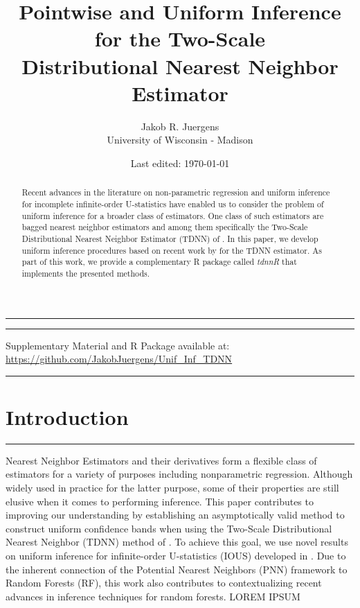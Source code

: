 \documentclass[letterpaper,10pt]{article}
\numberwithin{equation}{section}
\numberwithin{theorem}{section}
\numberwithin{remark}{section}
\numberwithin{example}{section}
\theoremstyle{definition}
\newcommand{\1}{\mathbb{1}}
\begin{document}
\singlespacing
\title{Pointwise and Uniform Inference for the Two-Scale\\ Distributional Nearest Neighbor Estimator}
\date{Last edited: \today}
\author{Jakob R. Juergens \\ University of Wisconsin - Madison}
\maketitle
\hrule
\onehalfspacing
\begin{abstract}
	Recent advances in the literature on non-parametric regression and uniform inference for incomplete infinite-order U-statistics have enabled us to consider the problem of uniform inference for a broader class of estimators.
	One class of such estimators are bagged nearest neighbor estimators and among them specifically the Two-Scale Distributional Nearest Neighbor Estimator (TDNN) of \citet{demirkaya_optimal_2024}.
	In this paper, we develop uniform inference procedures based on recent work by \citet{ritzwoller_uniform_2024} for the TDNN estimator.
	As part of this work, we provide a complementary R package called \textit{tdnnR} that implements the presented methods.
\end{abstract}
\vspace{0.3cm}
\hrule
\singlespacing

\vspace{-0.3cm}
\begin{center}
	{\small Supplementary Material and R Package available at: \url{https://github.com/JakobJuergens/Unif_Inf_TDNN}}
\end{center}
\vspace{0.3cm}
\hrule
\singlespacing
\thispagestyle{empty}


\newpage
\onehalfspacing
\section{Introduction}
\hrule
Nearest Neighbor Estimators and their derivatives form a flexible class of estimators for a variety of purposes including nonparametric regression.
Although widely used in practice for the latter purpose, some of their properties are still elusive when it comes to performing inference.
This paper contributes to improving our understanding by establishing an asymptotically valid method to construct uniform confidence bands when using the Two-Scale Distributional Nearest Neighbor (TDNN) method of \citet{demirkaya_optimal_2024}.
To achieve this goal, we use novel results on uniform inference for infinite-order U-statistics (IOUS) developed in \citet{ritzwoller_uniform_2024}.
Due to the inherent connection of the Potential Nearest Neighbors (PNN) framework to Random Forests (RF), this work also contributes to contextualizing recent advances in inference techniques for random forests.
	{\color{red} LOREM IPSUM}
\end{document}
